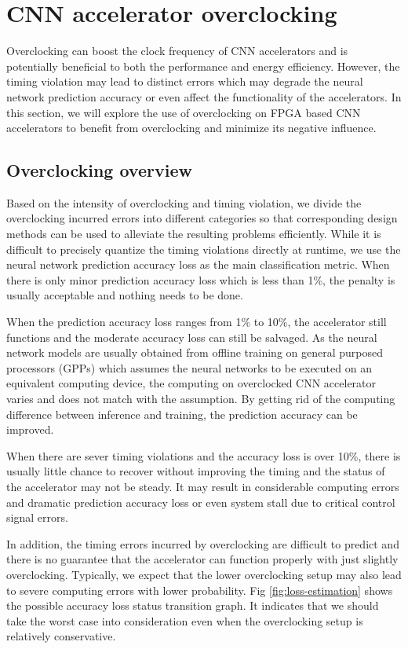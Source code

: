 \section{CNN accelerator overclocking} \label{sec:framework}
Overclocking can boost the clock frequency of CNN accelerators and is potentially beneficial to both 
the performance and energy efficiency. However, the timing violation may lead to distinct errors which 
may degrade the neural network prediction accuracy or even affect the functionality of the accelerators. 
In this section, we will explore the use of overclocking on FPGA based CNN accelerators to benefit from 
overclocking and minimize its negative influence.

\subsection{Overclocking overview}
Based on the intensity of overclocking and timing 
violation, we divide the overclocking incurred errors into different 
categories so that corresponding design methods can be used to 
alleviate the resulting problems efficiently. While it is difficult 
to precisely quantize the timing violations directly at runtime, we use 
the neural network prediction accuracy loss as the main 
classification metric. When there is only minor prediction accuracy 
loss which is less than 1\%, the penalty is usually acceptable 
and nothing needs to be done. 

When the prediction accuracy loss ranges from 1\% to 10\%, the accelerator 
still functions and the moderate accuracy loss can still be salvaged. 
As the neural network models are usually obtained 
from offline training on general purposed processors (GPPs) which assumes the 
neural networks to be executed on an equivalent computing device, 
the computing on overclocked CNN accelerator varies and does not match 
with the assumption. By getting rid of the computing difference between 
inference and training, the prediction accuracy can be improved.

When there are sever timing violations and 
the accuracy loss is over 10\%, there is usually little chance to recover 
without improving the timing and the status of the accelerator 
may not be steady. It may result in considerable computing errors 
and dramatic prediction accuracy loss 
or even system stall due to critical control signal errors.  

In addition, the timing errors incurred by overclocking are difficult 
to predict and there is no guarantee that the accelerator can function properly 
with just slightly overclocking. Typically, we expect that the lower overclocking setup 
may also lead to severe computing errors with lower probability.
Fig \ref{fig:loss-estimation} shows the possible accuracy loss status 
transition graph. It indicates that we should take the worst case 
into consideration even when the overclocking setup is relatively
conservative.

